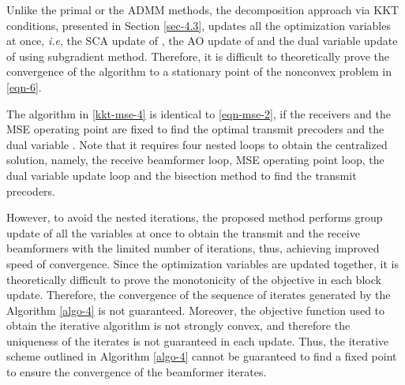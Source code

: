 Unlike the primal or the \ac{ADMM} methods, the decomposition approach via \ac{KKT} conditions, presented in Section \ref{sec-4.3}, updates all the optimization variables at once, \textit{i.e}, the \ac{SCA} update of , the \ac{AO} update of  and the dual variable update of \me{\alpha} using subgradient method. Therefore, it is difficult to theoretically prove the convergence of the algorithm to a stationary point of the nonconvex problem in \eqref{eqn-6}.

The algorithm in \eqref{kkt-mse-4} is identical to \eqref{eqn-mse-2}, if the receivers  and the \ac{MSE} operating point  are fixed to find the optimal transmit precoders  and the dual variable . Note that it requires four nested loops to obtain the centralized solution, namely, the receive beamformer loop, \ac{MSE} operating point loop, the dual variable update loop and the bisection method to find the transmit precoders. 

However, to avoid the nested iterations, the proposed method performs group update of all the variables at once to obtain the transmit and the receive beamformers with the limited number of iterations, thus, achieving improved speed of convergence. Since the optimization variables are updated together, it is theoretically difficult to prove the monotonicity of the objective in each block update. Therefore, the convergence of the sequence of iterates generated by the Algorithm \ref{algo-4} is not guaranteed. Moreover, the objective function used to obtain the iterative algorithm is not strongly convex, and therefore the uniqueness of the iterates is not guaranteed in each update. Thus, the iterative scheme outlined in Algorithm \ref{algo-4} cannot be guaranteed to find a fixed point to ensure the convergence of the beamformer iterates.

